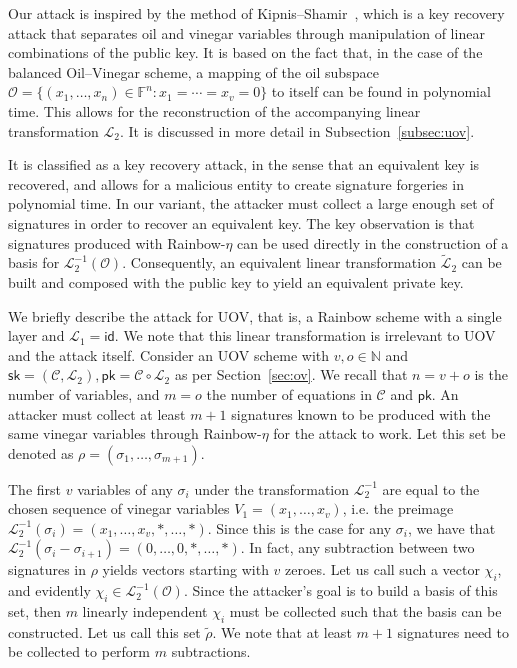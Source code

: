 \documentclass[12pt, a4paper, oneside]{memoir}
\theoremstyle{definition}
\begin{document}
Our attack is inspired by the method of Kipnis--Shamir~\cite{Kipnis:199808}, which is a key recovery attack that separates oil and vinegar variables through manipulation of linear combinations of the public key. It is based on the fact that, in the case of the balanced Oil--Vinegar scheme, a mapping of the oil subspace $\mathcal{O} = \{ (x_{1}, \dots, x_{n}) \in \mathbb{F}^{n} : x_{1} = \cdots = x_{v} = 0 \}$ to itself can be found in polynomial time. This allows for the reconstruction of the accompanying linear transformation $\mathcal{L}_{2}$. It is discussed in more detail in Subsection~\ref{subsec:uov}.

It is classified as a key recovery attack, in the sense that an equivalent key is recovered, and allows for a malicious entity to create signature forgeries in polynomial time. In our variant, the attacker must collect a large enough set of signatures in order to recover an equivalent key. The key observation is that signatures produced with Rainbow-$\eta$ can be used directly in the construction of a basis for $\mathcal{L}_{2}^{-1}(\mathcal{O})$. Consequently, an equivalent linear transformation $\widetilde{\mathcal{L}}_{2}$ can be built and composed with the public key to yield an equivalent private key.

We briefly describe the attack for UOV, that is, a Rainbow scheme with a single layer and $\mathcal{L}_{1} = \textsf{id}$. We note that this linear transformation is irrelevant to UOV and the attack itself. Consider an UOV scheme with $v, o \in \mathbb{N}$ and $\mathsf{sk} = (\mathcal{C}, \mathcal{L}_{2}), \mathsf{pk} = \mathcal{C} \circ \mathcal{L}_{2}$ as per Section~\ref{sec:ov}. We recall that $n = v + o$ is the number of variables, and $m = o$ the number of equations in $\mathcal{C}$ and $\mathsf{pk}$. An attacker must collect at least $m + 1$ signatures known to be produced with the same vinegar variables through Rainbow-$\eta$ for the attack to work. Let this set be denoted as $\rho = (\sigma_{1}, \dots, \sigma_{m + 1})$. 

The first $v$ variables of any $\sigma_{i}$ under the transformation $\mathcal{L}_{2}^{-1}$ are equal to the chosen sequence of vinegar variables $V_{1} = (x_{1}, \dots, x_{v})$, i.e. the preimage $\mathcal{L}_{2}^{-1}(\sigma_{i}) = (x_{1}, \dots, x_{v}, \ast, \dots, \ast)$. Since this is the case for any $\sigma_{i}$, we have that $\mathcal{L}_{2}^{-1}(\sigma_{i} - \sigma_{i + 1}) = (0, \dots, 0, \ast, \dots, \ast)$. In fact, any subtraction between two signatures in $\rho$ yields vectors starting with $v$ zeroes. Let us call such a vector $\chi_{i}$, and evidently $\chi_{i} \in \mathcal{L}_{2}^{-1}(\mathcal{O})$. Since the attacker's goal is to build a basis of this set, then $m$ linearly independent $\chi_{i}$ must be collected such that the basis can be constructed. Let us call this set $\widetilde{\rho}$. We note that at least $m + 1$ signatures need to be collected to perform $m$ subtractions.
\end{document}
